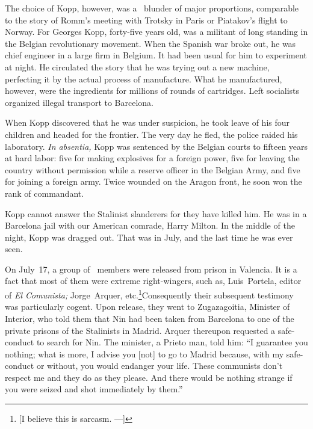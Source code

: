 The choice of Kopp, however, was a \GPU\ blunder of major proportions, comparable to the story of Romm’s meeting with Trotsky in Paris or Piatakov’s flight to Norway. For Georges Kopp, forty-five years old, was a militant of long standing in the Belgian revolutionary movement. When the Spanish war broke out, he was chief engineer in a large firm in Belgium. It had been usual for him to experiment at night. He circulated the story that he was trying out a new machine, perfecting it by the actual process of manufacture. What he manufactured, however, were the ingredients for millions of rounds of cartridges. Left socialists organized illegal transport to Barcelona.

When Kopp discovered that he was under suspicion, he took leave of his four children and headed for the frontier. The very day he fled, the police raided his laboratory. \emph{In absentia,} Kopp was sentenced by the Belgian courts to fifteen years at hard labor: five for making explosives for a foreign power, five for leaving the country without permission while a reserve officer in the Belgian Army, and five for joining a foreign army. Twice wounded on the Aragon front, he soon won the rank of commandant.

Kopp cannot answer the Stalinist slanderers for they have killed him. He was in a Barcelona jail with our American comrade, Harry Milton. In the middle of the night, Kopp was dragged out. That was in July, and the last time he was ever seen.

On July~17, a group of \POUM\ members were released from prison in Valencia. It is a fact that most of them were extreme right-wingers, such as, Luis~Portela, editor of \emph{El Comunista;} Jorge~Arquer, etc.\footnote{[I believe this is sarcasm. ---\JCW]}\@ Consequently their subsequent testimony was particularly cogent. Upon release, they went to Zugazagoitia, Minister of Interior, who told them that Nin{\indexANin} had been taken from Barcelona to one of the private prisons of the Stalinists in Madrid. Arquer thereupon requested a safe-conduct to search for Nin. The minister, a Prieto man, told him: ``I guarantee you nothing; what is more, I advise you [not] to go to Madrid because, with my safe-conduct or without, you would endanger your life. These communists don’t respect me and they do as they please. And there would be nothing strange if you were seized and shot immediately by them.''

